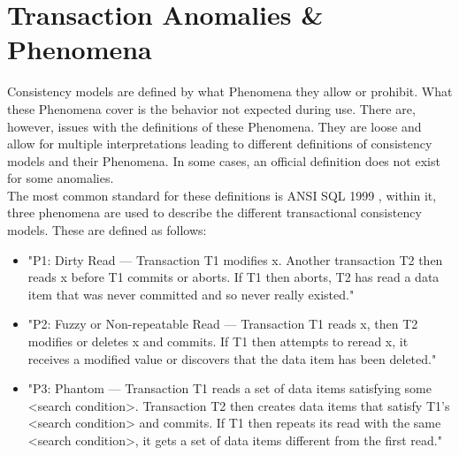 \documentclass[a4paper,10pt,titlepage]{report}
\begin{document}
\newpage
\section{Transaction Anomalies \& Phenomena}

Consistency models are defined by what Phenomena they allow or prohibit. What these Phenomena cover is the behavior not expected during use. There are, however, issues with the definitions of these Phenomena. They are loose and allow for multiple interpretations leading to different definitions of consistency models and their Phenomena. In some cases, an official definition does not exist for some anomalies.\\
\vspace{1\baselineskip}
The most common standard for these definitions is ANSI SQL 1999 \cite{ansisql1999}, within it, three phenomena are used to describe the different transactional consistency models. These are defined as follows:
\begin{itemize}
    \item "P1: Dirty Read — Transaction T1 modifies x. Another transaction T2 then reads x before T1 commits or aborts. If T1 then aborts, T2 has read a data item that was never committed and so never really existed."
    \item "P2: Fuzzy or Non-repeatable Read — Transaction T1 reads x, then T2 modifies or deletes x and commits. If T1 then attempts to reread x, it receives a modified value or discovers that the data item has been deleted."
    \item "P3: Phantom — Transaction T1 reads a set of data items satisfying some <search condition>. Transaction T2 then creates data items that satisfy T1's <search condition> and commits. If T1 then repeats its read with the same <search condition>, it gets a set of data items different from the first read."
\end{itemize}
\end{document}

